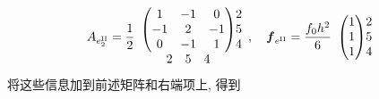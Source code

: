 \[A_{e_2^{\mathrm {II}}}=\frac12\begin{array}{c@{}c}
\begin{pmatrix}1&-1&0\\-1&2&-1\\0&-1&1\end{pmatrix}&\begin{matrix}2\\5\\4\end{matrix}\\
\begin{matrix}2&5&4\end{matrix}&\end{array},\quad
\boldsymbol{f}_{e^{\mathrm {II}}}=\frac{f_0h^2}{6}\begin{array}{c@{}c}\begin{pmatrix}1\\1\\1\end{pmatrix}&\begin{matrix}2\\5\\4\end{matrix}\end{array}\]
{将这些信息加到前述矩阵和右端项上, 得到}
